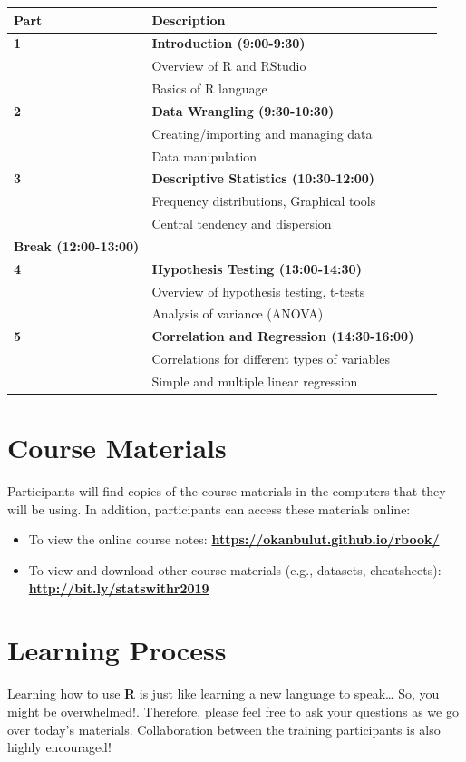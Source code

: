 \documentclass[]{book}
\providecommand{\tightlist}{%
  \setlength{\itemsep}{0pt}\setlength{\parskip}{0pt}}
\begin{document}
\begin{longtable}[]{@{}ll@{}}
\toprule
Part & Description\tabularnewline
\midrule
\endhead
\textbf{1} & \textbf{Introduction (9:00-9:30)} ~~\tabularnewline
& Overview of R and RStudio\tabularnewline
& Basics of R language\tabularnewline
\textbf{2} & \textbf{Data Wrangling (9:30-10:30)} ~~\tabularnewline
& Creating/importing and managing data\tabularnewline
& Data manipulation\tabularnewline
\textbf{3} & \textbf{Descriptive Statistics (10:30-12:00)} ~~\tabularnewline
& Frequency distributions, Graphical tools\tabularnewline
& Central tendency and dispersion\tabularnewline
\textbf{Break (12:00-13:00)} &\tabularnewline
\textbf{4} & \textbf{Hypothesis Testing (13:00-14:30)} ~~\tabularnewline
& Overview of hypothesis testing, t-tests\tabularnewline
& Analysis of variance (ANOVA)\tabularnewline
\textbf{5} & \textbf{Correlation and Regression (14:30-16:00)} ~~\tabularnewline
& Correlations for different types of variables\tabularnewline
& Simple and multiple linear regression\tabularnewline
\bottomrule
\end{longtable}

\hypertarget{course-materials}{%
\section{Course Materials}\label{course-materials}}

Participants will find copies of the course materials in the computers that they will be using. In addition, participants can access these materials online:

\begin{itemize}
\tightlist
\item
  To view the online course notes: \href{https://okanbulut.github.io/rbook/}{\textbf{https://okanbulut.github.io/rbook/}}
\item
  To view and download other course materials (e.g., datasets, cheatsheets): \href{http://bit.ly/statswithr2019}{\textbf{http://bit.ly/statswithr2019}}
\end{itemize}

\hypertarget{learning-process}{%
\section{Learning Process}\label{learning-process}}

{ Learning how to use \textbf{R} is just like learning a new language to speak\ldots{} So, you might be overwhelmed!}. Therefore, please feel free to ask your questions as we go over today's materials. Collaboration between the training participants is also highly encouraged!
\end{document}
